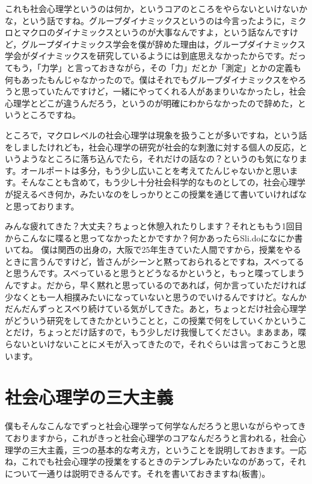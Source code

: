 \documentclass{ltjsbook}
\begin{document}
これも社会心理学というのは何か，というコアのところをやらないといけないかな，という話ですね。グループダイナミックスというのは今言ったように，ミクロとマクロのダイナミックスというのが大事なんですよ，という話なんですけど，グループダイナミックス学会を僕が辞めた理由は，グループダイナミックス学会がダイナミックスを研究しているようには到底思えなかったからです。だってもう，「力学」と言っておきながら，その「力」だとか「測定」とかの定義も何もあったもんじゃなかったので。僕はそれでもグループダイナミックスをやろうと思っていたんですけど，一緒にやってくれる人があまりいなかったし，社会心理学とどこが違うんだろう，というのが明確にわからなかったので辞めた，というところですね。

ところで，マクロレベルの社会心理学は現象を扱うことが多いですね，という話をしましたけれども，社会心理学の研究が社会的な刺激に対する個人の反応，というようなところに落ち込んでたら，それだけの話なの？というのも気になります。オールポートは多分，もう少し広いことを考えてたんじゃないかと思います。そんなことも含めて，もう少し十分社会科学的なものとしての，社会心理学が捉えるべき何か，みたいなのをしっかりとこの授業を通じて書いていければなと思っております。

みんな疲れてきた？大丈夫？ちょっと休憩入れたりします？それとももう1回目からこんなに喋ると思ってなかったとかですか？何かあったらSli.doになにか書いてね。
僕は関西の出身の，大阪で25年生きていた人間ですから，授業をやるときに言うんですけど，皆さんがシーンと黙っておられるとですね，スベってると思うんです。スベっていると思うとどうなるかというと，もっと喋ってしまうんですよ。だから，早く黙れと思っているのであれば，何か言っていただければ少なくとも一人相撲みたいになっていないと思うのでいけるんですけど。なんかだんだんずっとスベり続けている気がしてきた。あと，ちょっとだけ社会心理学がどういう研究をしてきたかということと，この授業で何をしていくかということだけ，ちょっとだけ話すので，もう少しだけ我慢してください。まあまあ，喋らないといけないことにメモが入ってきたので，それぐらいは言っておこうと思います。

\section{社会心理学の三大主義}

僕もそんなこんなでずっと社会心理学って何学なんだろうと思いながらやってきておりますから，これがきっと社会心理学のコアなんだろうと言われる，社会心理学の三大主義，三つの基本的な考え方，ということを説明しておきます。一応ね，これでも社会心理学の授業をするときのテンプレみたいなのがあって，それについて一通りは説明できるんです。それを書いておきますね(板書)。
\end{document}
